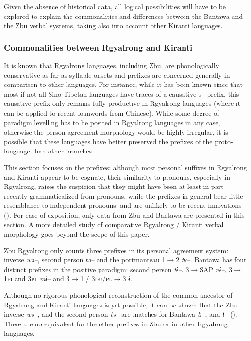 \documentclass[twoside,a4paper,11pt]{article}
\newcommand{\ipa}[1]{{\phon\textit{#1}}}
\newcommand{\Σ}{\greek{Σ}}
\begin{document}
Given the absence of historical data, all logical possibilities will have to be explored to explain the commonalities and differences between the Bantawa and the Zbu verbal systems, taking also into account other Kiranti languages.




\subsubsection{Commonalities between Rgyalrong and Kiranti}

It is known that  Rgyalrong languages, including Zbu, are   phonologically conservative as far as syllable onsets and prefixes are concerned generally in comparison to other languages. For instance, while it has been known since \citet{conrady1896} that most if not all Sino-Tibetan languages have  traces of a causative \ipa{s--} prefix, this causative prefix only remains fully productive in Rgyalrong languages (where it can be applied to recent loanwords from Chinese). While some degree of paradigm levelling has to be posited in Rgyalrong languages in any case, otherwise the person agreement morphology would be highly irregular, it is possible that these languages have better preserved the prefixes of the proto-language than other branches.

This section focuses on the   prefixes; although most personal suffixes in Rgyalrong and Kiranti appear to be cognate, their similarity to pronouns, especially in Rgyalrong, raises the suspicion that they might have been at least in part recently  grammaticalized from pronouns, while the prefixes in general bear little resemblance to independent pronouns, and are unlikely to be recent innovations (\citealt{jacques12agreement}).   For ease of exposition, only data from Zbu and Bantawa are presented in this section. A more detailed study of comparative Rgyalrong / Kiranti verbal morphology goes beyond the scope of this paper.

Zbu Rgyalrong only counts three prefixes in its personal agreement system:   inverse   \ipa{wə--},   second person   \ipa{tə--}  and the portmanteau 1$\rightarrow$2   \ipa{tɐ--}. Bantawa has four distinct prefixes in the positive paradigm:   second person \ipa{tɨ--},   3$\rightarrow$SAP \ipa{nɨ--}, 3$\rightarrow$\textsc{1pi} and \textsc{3pl} \ipa{mɨ--} and 3$\rightarrow$1 / \textsc{3du/pl}$\rightarrow$3 \ipa{ɨ}. 


Although no rigorous phonological reconstruction of the common ancestor of Rgyalrong and Kiranti languages is yet possible,  it can be shown that  the Zbu inverse  \ipa{wə--}, and the  second person   \ipa{tə--}  are matches for Bantawa \ipa{tɨ--},  and \ipa{ɨ--} (\citealt{jacques12agreement}). There are no equivalent for the other prefixes in Zbu or in other Rgyalrong languages.
\end{document}
